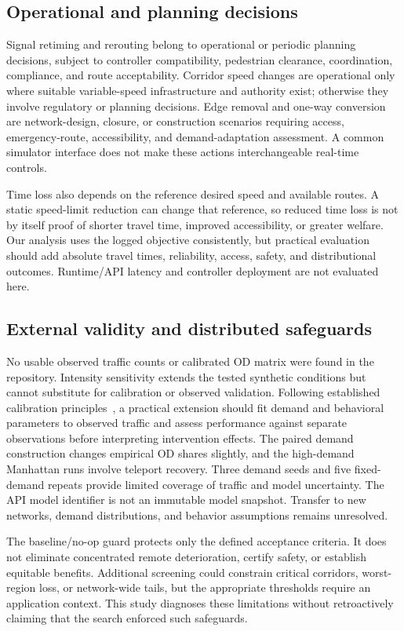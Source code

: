 \documentclass[11pt]{article}
\begin{document}
\subsection{Operational and planning decisions}\label{sec:horizons}
Signal retiming and rerouting belong to operational or periodic planning decisions, subject to controller compatibility, pedestrian clearance, coordination, compliance, and route acceptability. Corridor speed changes are operational only where suitable variable-speed infrastructure and authority exist; otherwise they involve regulatory or planning decisions. Edge removal and one-way conversion are network-design, closure, or construction scenarios requiring access, emergency-route, accessibility, and demand-adaptation assessment. A common simulator interface does not make these actions interchangeable real-time controls.

Time loss also depends on the reference desired speed and available routes. A static speed-limit reduction can change that reference, so reduced time loss is not by itself proof of shorter travel time, improved accessibility, or greater welfare. Our analysis uses the logged objective consistently, but practical evaluation should add absolute travel times, reliability, access, safety, and distributional outcomes. Runtime/API latency and controller deployment are not evaluated here.

\subsection{External validity and distributed safeguards}\label{sec:limitations}
No usable observed traffic counts or calibrated OD matrix were found in the repository. Intensity sensitivity extends the tested synthetic conditions but cannot substitute for calibration or observed validation. Following established calibration principles~\cite{hollander2008calibration,wunderlich2019toolbox}, a practical extension should fit demand and behavioral parameters to observed traffic and assess performance against separate observations before interpreting intervention effects. The paired demand construction changes empirical OD shares slightly, and the high-demand Manhattan runs involve teleport recovery. Three demand seeds and five fixed-demand repeats provide limited coverage of traffic and model uncertainty. The API model identifier is not an immutable model snapshot. Transfer to new networks, demand distributions, and behavior assumptions remains unresolved.

The baseline/no-op guard protects only the defined acceptance criteria. It does not eliminate concentrated remote deterioration, certify safety, or establish equitable benefits. Additional screening could constrain critical corridors, worst-region loss, or network-wide tails, but the appropriate thresholds require an application context. This study diagnoses these limitations without retroactively claiming that the search enforced such safeguards.
\end{document}
